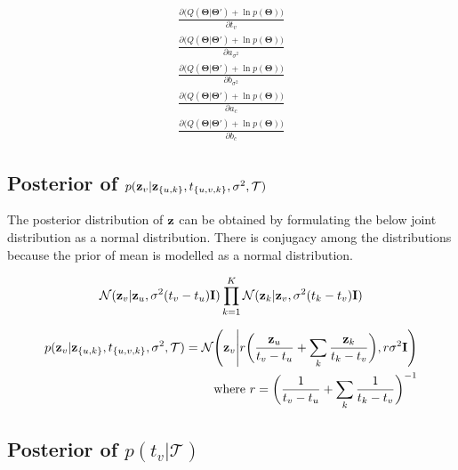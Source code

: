 \documentclass{article}
\begin{document}
	\begin{eqnarray}
	\frac{\partial \big( Q(\boldsymbol{\Theta}|\boldsymbol{\Theta}') + \ln{p(\boldsymbol{\Theta})} \big)}{\partial t_v} \\
	\frac{\partial \big( Q(\boldsymbol{\Theta}|\boldsymbol{\Theta}') + \ln{p(\boldsymbol{\Theta})} \big)}{\partial a_{\sigma^2}} \\
	\frac{\partial \big( Q(\boldsymbol{\Theta}|\boldsymbol{\Theta}') + \ln{p(\boldsymbol{\Theta})} \big)}{\partial b_{\sigma^2}} \\
	\frac{\partial \big( Q(\boldsymbol{\Theta}|\boldsymbol{\Theta}') + \ln{p(\boldsymbol{\Theta})} \big)}{\partial a_c} \\
	\frac{\partial \big( Q(\boldsymbol{\Theta}|\boldsymbol{\Theta}') + \ln{p(\boldsymbol{\Theta})} \big)}{\partial b_c}
	\end{eqnarray}

\subsection{Posterior of $p(\bold{z}_v | \bold{z}_{\{u, k\}}, t_{\{u, v, k\}}, \sigma^2, \mathcal{T})$}	

The posterior distribution of $\bold{z}$ can be obtained by formulating the below joint distribution as a normal distribution. There is conjugacy among the distributions because the prior of mean is modelled as a normal distribution.

	\begin{eqnarray}
	\mathcal{N}(\bold{z}_v | \bold{z}_u, \sigma^2(t_v - t_u)\bold{I})
	\prod^{K}_{k=1} \mathcal{N}(\bold{z}_k | \bold{z}_v, \sigma^2(t_k - t_v)\bold{I})
	\end{eqnarray}

	\begin{eqnarray}
	p(\bold{z}_v | \bold{z}_{\{u, k\}}, t_{\{u, v, k\}}, \sigma^2, \mathcal{T}) = \mathcal{N} \Bigg( \bold{z}_v \Bigg| r \bigg( \frac{\bold{z}_u}{t_v - t_u} + \sum_k \frac{\bold{z}_k}{t_k - t_v} \bigg), r\sigma^2\bold{I} \Bigg) \\
	\textrm{where } r = \bigg( \frac{1}{t_v - t_u} + \sum_k \frac{1}{t_k - t_v} \bigg)^{-1} \nonumber
	\end{eqnarray}

\subsection{Posterior of $p(t_v | \mathcal{T})$}	
	
\end{document}
